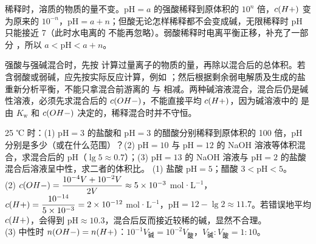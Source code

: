 稀释时，溶质的物质的量不变。pH$=a$ 的强酸稀释到原体积的 $10^n$ 倍，$c(H+)$ 变为原来的 $10^{-n}$，pH$=a+n$；但酸无论怎样稀释都不会变成碱，无限稀释时 pH 只能接近 7（此时水电离的  不能再忽略）。弱酸稀释时电离平衡正移，补充了一部分 ，所以 $a<\text{pH}<a+n$。

强酸与强碱混合时，先按  计算过量离子的物质的量，再除以混合后的总体积。若含弱酸或弱碱，应先按实际反应计算，例如 ；然后根据剩余弱电解质及生成的盐重新分析平衡，不能只拿混合前游离的  与  相减。两种碱溶液混合，混合后仍是碱性溶液，必须先求混合后的 $c(OH-)$，不能直接平均 $c(H+)$，因为碱溶液中的  是由 $K_\text{w}$ 和 $c(OH-)$ 决定的，稀释混合时并不守恒。

\begin{liti}[典型]
25 ℃ 时：(1) pH$=3$ 的盐酸和 pH$=3$ 的醋酸分别稀释到原体积的 100 倍，pH 分别是多少（或在什么范围）？(2) pH$=10$ 与 pH$=12$ 的 NaOH 溶液等体积混合，求混合后的 pH（$\lg5\approx0.7$）；(3) pH$=13$ 的 NaOH 溶液与 pH$=2$ 的盐酸混合后溶液呈中性，求二者的体积比。
\tcblower
\jie (1) 盐酸 pH$=5$；醋酸 $3<$pH$<5$。\\
(2) $c(OH-)=\dfrac{10^{-4}V+10^{-2}V}{2V}\approx5\times10^{-3}$ mol·L$^{-1}$，$c(H+)=\dfrac{10^{-14}}{5\times10^{-3}}=2\times10^{-12}$ mol·L$^{-1}$，pH$=12-\lg2\approx11.7$。若错误地平均 $c(H+)$，会得到 pH$\approx10.3$，混合后反而接近较稀的碱，显然不合理。\\
(3) 中性时 $n(OH-)=n(H+)$：$10^{-1}V_\text{碱}=10^{-2}V_\text{酸}$，$V_\text{碱}:V_\text{酸}=1:10$。
\end{liti}

